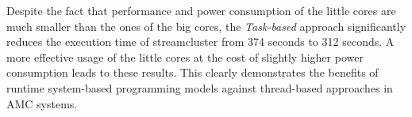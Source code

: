 Despite the fact that performance and power consumption of the little cores are much smaller than the ones of the big cores, the \emph{Task-based} approach significantly reduces the execution time of streamcluster from 374 seconds to 312 seconds. A more effective usage of the little cores at the cost of slightly higher power consumption leads to these results. This clearly demonstrates the benefits of runtime system-based programming models against thread-based approaches in AMC systems.
\fi











